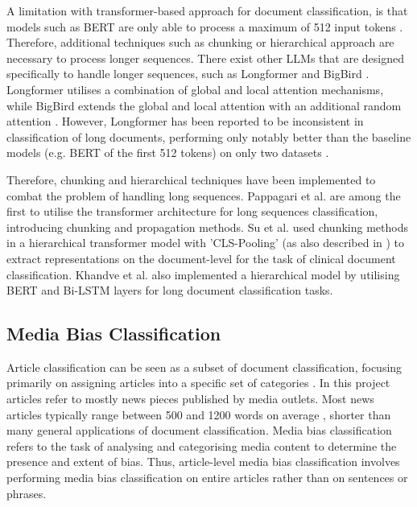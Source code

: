 A limitation with transformer-based approach for document classification, is that models such as BERT are only able to process a maximum of 512 input tokens \cite{devlin-2019-bert}. Therefore, additional techniques such as chunking or hierarchical approach are necessary to process longer sequences. There exist other LLMs that are designed specifically to handle longer sequences, such as Longformer \cite{beltagy-2020-longformer} and BigBird \cite{zaheer-2021-bigbird}. Longformer utilises a combination of global and local attention mechanisms, while BigBird extends the global and local attention with an additional random attention \cite{zaheer-2021-bigbird,beltagy-2020-longformer}. However, Longformer has been reported to be inconsistent in classification of long documents, performing only notably better than the baseline models (e.g. BERT of the first 512 tokens) on only two datasets \cite{park-2022-efficient}.

Therefore, chunking and hierarchical techniques have been implemented to combat the problem of handling long sequences. Pappagari et al. \cite{pappagari-2019-hierarchical} are among the first to utilise the transformer architecture for long sequences classification, introducing chunking and propagation methods. Su et al. \cite{su-2021-classifying} used chunking methods in a hierarchical transformer model with 'CLS-Pooling' (as also described in \cite{adhikari-2019-docbert}) to extract representations on the document-level for the task of clinical document classification. Khandve et al. \cite{khandve-2022-hierarchical-longdoc} also implemented a hierarchical model by utilising BERT and Bi-LSTM layers for long document classification tasks.


\subsection{Media Bias Classification}

Article classification can be seen as a subset of document classification, focusing primarily on assigning articles into a specific set of categories \cite{dien-2019-article-classification}. In this project articles refer to mostly news pieces published by media outlets. Most news articles typically range between 500 and 1200 words on average \cite{newswhip-2013-article-length}, shorter than many general applications of document classification. Media bias classification refers to the task of analysing and categorising media content to determine the presence and extent of bias. Thus, article-level media bias classification involves performing media bias classification on entire articles rather than on sentences or phrases.

